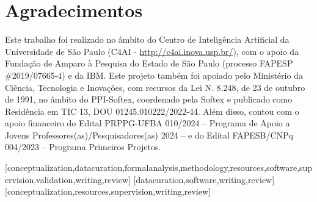 \documentclass[portuguese]{textolivre}
\begin{document}
\begin{polyabstract}
\begin{english}
\begin{abstract}
  

\end{abstract}
\end{english}
\end{polyabstract}







\section{Agradecimentos}

Este trabalho foi realizado no âmbito do Centro de Inteligência
Artificial da Universidade de São Paulo (C4AI -
\url{http://c4ai.inova.usp.br/}), com o apoio da Fundação de Amparo à Pesquisa
do Estado de São Paulo (processo FAPESP \#2019/07665-4) e da IBM. Este
projeto também foi apoiado pelo Ministério da Ciência, Tecnologia e
Inovações, com recursos da Lei N. 8.248, de 23 de outubro de 1991, no
âmbito do PPI-Softex, coordenado pela Softex e publicado como Residência
em TIC 13, DOU 01245.010222/2022-44. Além disso, contou com o apoio
financeiro do Edital PRPPG-UFBA 010/2024 -- Programa de Apoio a Jovens
Professores(as)/Pesquisadores(as) 2024 -- e do Edital FAPESB/CNPq
004/2023 -- Programa Primeiros Projetos.



\printbibliography\label{sec-bib}
\begin{contributors}
[conceptualization,datacuration,formalanalysis,methodology,resources,software,supervision,validation,writing,review]
[datacuration,software,writing,review]
[conceptualization,resources,supervision,writing,review]
\end{contributors}
\end{document}
